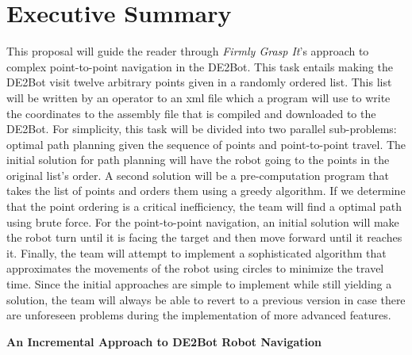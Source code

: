 \documentclass[11pt,conference,onecolumn]{article} %
\begin{document}
\section*{Executive Summary}
This proposal will guide the reader through \emph{Firmly Grasp It}'s approach to complex point-to-point navigation in the DE2Bot. This task entails making the DE2Bot visit twelve arbitrary points given in a randomly ordered list. This list will be written by an operator to an xml file which a program will use to write the coordinates to the assembly file that is compiled and downloaded to the DE2Bot. For simplicity, this task will be divided into two parallel sub-problems: optimal path planning given the sequence of points and point-to-point travel. The initial solution for path planning will have the robot going to the points in the original list's order. A second solution will be a pre-computation program that takes the list of points and orders them using a greedy algorithm. If we determine that the point ordering is a critical inefficiency, the team will find a optimal path using brute force. For the point-to-point navigation, an initial solution will make the robot turn until it is facing the target and then move forward until it reaches it. Finally, the team will attempt to implement a sophisticated algorithm that approximates the movements of the robot using circles to minimize the travel time. Since the initial approaches are simple to implement while still yielding a solution, the team will always be able to revert to a previous version in case there are unforeseen problems during the implementation of more advanced features.


\clearpage

\begin{center}
  
   \textbf{\LARGE An Incremental Approach to DE2Bot Robot Navigation}
\end{center}
\end{document}
